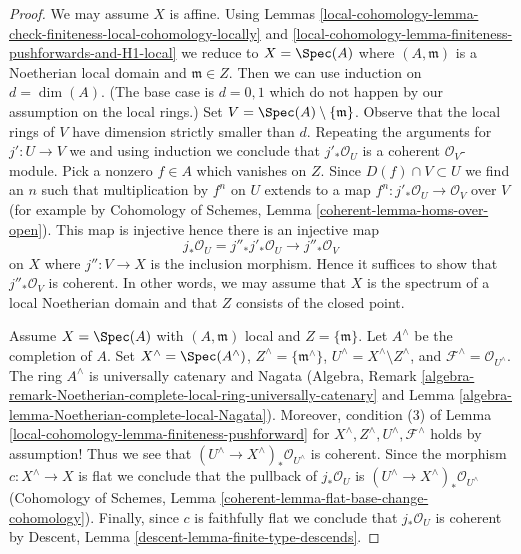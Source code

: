 \begin{proof}
We may assume $X$ is affine.
Using Lemmas \ref{local-cohomology-lemma-check-finiteness-local-cohomology-locally} and
\ref{local-cohomology-lemma-finiteness-pushforwards-and-H1-local} we reduce to
$X = \Spec(A)$ where $(A, \mathfrak m)$ is a Noetherian local domain
and $\mathfrak m \in Z$.
Then we can use induction on $d = \dim(A)$.
(The base case is $d = 0, 1$ which do not happen by
our assumption on the local rings.)
Set $V = \Spec(A) \setminus \{\mathfrak m\}$.
Observe that the local rings of $V$ have dimension strictly smaller than $d$.
Repeating the arguments for $j' : U \to V$ we
and using induction we conclude that $j'_*\mathcal{O}_U$ is
a coherent $\mathcal{O}_V$-module.
Pick a nonzero $f \in A$ which vanishes on $Z$.
Since $D(f) \cap V \subset U$ we find an $n$ such that
multiplication by $f^n$ on $U$ extends to a map
$f^n : j'_*\mathcal{O}_U \to \mathcal{O}_V$ over $V$
(for example by Cohomology of Schemes, Lemma
\ref{coherent-lemma-homs-over-open}). This map is injective
hence there is an injective map
$$
j_*\mathcal{O}_U = j''_* j'_* \mathcal{O}_U \to j''_*\mathcal{O}_V
$$
on $X$ where $j'' : V \to X$ is the inclusion morphism.
Hence it suffices to show that $j''_*\mathcal{O}_V$ is coherent.
In other words, we may assume that $X$ is the spectrum
of a local Noetherian domain and that $Z$
consists of the closed point.

\medskip\noindent
Assume $X = \Spec(A)$ with $(A, \mathfrak m)$ local and $Z = \{\mathfrak m\}$.
Let $A^\wedge$ be the completion of $A$.
Set $X^\wedge = \Spec(A^\wedge)$, $Z^\wedge = \{\mathfrak m^\wedge\}$,
$U^\wedge = X^\wedge \setminus Z^\wedge$, and
$\mathcal{F}^\wedge = \mathcal{O}_{U^\wedge}$.
The ring $A^\wedge$ is universally catenary and Nagata (Algebra, Remark
\ref{algebra-remark-Noetherian-complete-local-ring-universally-catenary} and
Lemma \ref{algebra-lemma-Noetherian-complete-local-Nagata}).
Moreover, condition (3) of Lemma \ref{local-cohomology-lemma-finiteness-pushforward}
for $X^\wedge, Z^\wedge, U^\wedge, \mathcal{F}^\wedge$
holds by assumption! Thus we see that
$(U^\wedge \to X^\wedge)_*\mathcal{O}_{U^\wedge}$
is coherent. Since the morphism $c : X^\wedge \to X$
is flat we conclude that the pullback of $j_*\mathcal{O}_U$ is
$(U^\wedge \to X^\wedge)_*\mathcal{O}_{U^\wedge}$
(Cohomology of Schemes, Lemma
\ref{coherent-lemma-flat-base-change-cohomology}).
Finally, since $c$ is faithfully flat we conclude that
$j_*\mathcal{O}_U$ is coherent by
Descent, Lemma \ref{descent-lemma-finite-type-descends}.
\end{proof}

